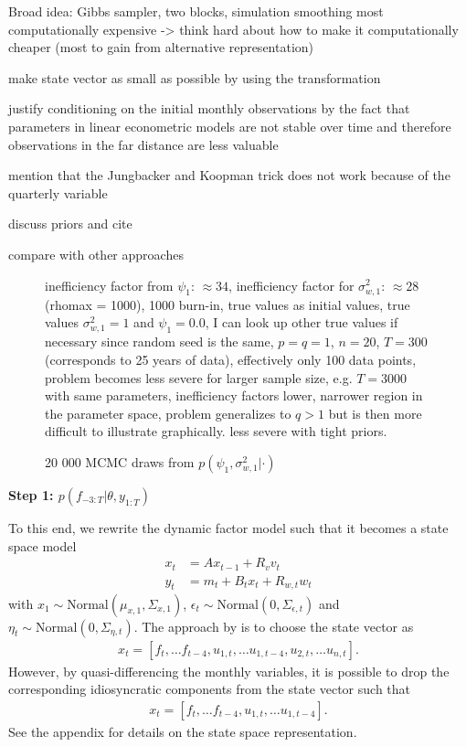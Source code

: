 Broad idea: Gibbs sampler, two blocks, simulation smoothing most computationally expensive -> think hard about how to make it computationally cheaper (most to gain from alternative representation)

make state vector as small as possible by using the transformation

justify conditioning on the initial monthly observations by the fact that parameters in linear econometric models are not stable over time and therefore observations in the far distance are less valuable

mention that the Jungbacker and Koopman trick does not work because of the quarterly variable

discuss priors and cite \citet{BaiWang2015}

compare with other approaches

\begin{figure}[tb]
	\caption{20 000 MCMC draws from $p(\psi_1, \sigma^2_{w,1}|\cdot)$}
	\small inefficiency factor from $\psi_1$: $\approx 34$, inefficiency factor for $\sigma^2_{w,1}$: $\approx 28$ (rhomax = 1000), 1000 burn-in, true values as initial values, true values $\sigma^2_{w,1}=1$ and $\psi_1=0.0$, I can look up other true values if necessary since random seed is the same, $p=q=1$, $n=20$, $T=300$ (corresponds to 25 years of data), effectively only 100 data points, problem becomes less severe for larger sample size, e.g. $T=3000$ with same parameters, inefficiency factors lower, narrower region in the parameter space, problem generalizes to $q>1$ but is then more difficult to illustrate graphically. less severe with tight priors.
	\label{fig:arma_problem}
\end{figure}

\textbf{Step 1: $p(f_{-3:T}|\theta, y_{1:T})$}

To this end, we rewrite the dynamic factor model such that it becomes a state space model
\begin{align}
\label{eqn:ssm_obs}
x_t &= A x_{t-1} + R_v v_t \\
y_t &= m_t + B_t x_t + R_{w,t} w_t
\end{align}
with $x_1\sim \mathrm{Normal}(\mu_{x,1}, \Sigma_{x,1})$, $\epsilon_t\sim \mathrm{Normal}(0, \Sigma_{\epsilon,t})$ and $\eta_t\sim \mathrm{Normal}(0, \Sigma_{\eta,t})$. The approach by \citet{MarcellinoEtal2016} is to choose the state vector as 
\begin{align}
x_t = [f_t, \dots f_{t-4}, u_{1,t}, \dots u_{1, t-4}, u_{2,t}, \dots u_{n,t}].
\end{align}
However, by quasi-differencing the monthly variables, it is possible to drop the corresponding idiosyncratic components from the state vector such that 
\begin{align}
x_t = [f_t, \dots f_{t-4}, u_{1,t}, \dots u_{1, t-4}]. 
\end{align}
See the appendix for details on the state space representation. \\

